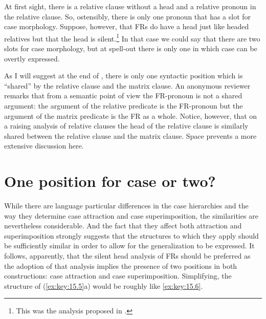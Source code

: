 \documentclass[output=paper]{langsci/langscibook}
\begin{document}
\begin{refcontext}
\ea\label{ex:key:15.5}
    \z
\z
At first sight, there is a relative clause without a head and a relative
pronoun in the relative clause. So, ostensibly, there is only one pronoun that
has a slot for case morphology. Suppose, however, that \glspl{FR} do have a
head just like headed relatives but that the head is silent.\footnote{This was
the analysis proposed in \citet{GroosVanRiemsdijk1981}.} In that case we could
say that there are two slots for case morphology, but at spell-out there is
only one in which case can be overtly expressed.

As I will suggest at the end of , there is only one
syntactic position which is \enquote{shared} by the relative clause and the
matrix clause. An anonymous reviewer remarks that from a semantic point of view
the FR-pronoun is not a shared argument: the argument of the relative predicate
is the FR-pronoun but the argument of the matrix predicate is the FR as a
whole. Notice, however, that on a raising analysis of relative
clauses the head
of the relative clause is similarly shared between the relative clause and the
matrix clause. Space prevents a more extensive discussion here.

\section{One position for case or two?}

While there are language particular differences in the case hierarchies and the
way they determine case attraction and case superimposition, the similarities
are nevertheless considerable. And the fact that they affect both attraction
and superimposition strongly suggests that the structures to which they apply
should be sufficiently similar in order to allow for the generalization to be
expressed. It follows, apparently, that the silent head analysis of \glspl{FR}
should be preferred as the adoption of that analysis implies the presence of
two positions in both constructions: case attraction and case superimposition.
Simplifying, the structure of  (\ref{ex:key:15.5}a) would be roughly like \eqref{ex:key:15.6}.


\end{refcontext}
\end{document}
